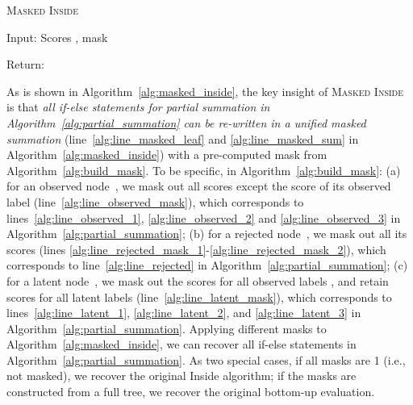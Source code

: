 \begin{algorithm}[t!]
  \small
  \caption{\label{alg:masked_inside} \textsc{Masked Inside}}
  \begin{algorithmic}[1]
  
  \State Input: Scores , mask 
    \State  \label{alg:line_masked_leaf}  
  \EndFor
\State {}
\State {}
  \EndFor

  \State Return: 
  
\end{algorithmic}
\end{algorithm}

 

As is shown in Algorithm~\ref{alg:masked_inside}, the key insight of \textsc{Masked Inside} is that \textit{all if-else statements for partial summation in Algorithm~\ref{alg:partial_summation} 
can be re-written in a unified masked summation} (line~\ref{alg:line_masked_leaf} and \ref{alg:line_masked_sum} in Algorithm~\ref{alg:masked_inside}) with a pre-computed mask  from Algorithm~\ref{alg:build_mask}. 
To be specific, in Algorithm~\ref{alg:build_mask}: 
(a) for an observed node~, we mask out all scores except the score of its observed label (line~\ref{alg:line_observed_mask}), 
which corresponds to lines~\ref{alg:line_observed_1}, \ref{alg:line_observed_2} and \ref{alg:line_observed_3} in Algorithm~\ref{alg:partial_summation}; 
(b) for a rejected node~, we mask out all its scores (lines \ref{alg:line_rejected_mask_1}-\ref{alg:line_rejected_mask_2}), which corresponds to line~\ref{alg:line_rejected} in Algorithm~\ref{alg:partial_summation}; 
(c) for a latent node~\scalebox{0.8}{}, we mask out the scores for all observed labels , and retain scores for all latent labels  (line~\ref{alg:line_latent_mask}), which corresponds to lines~\ref{alg:line_latent_1}, \ref{alg:line_latent_2}, and \ref{alg:line_latent_3} in Algorithm~\ref{alg:partial_summation}. 
Applying different masks to Algorithm~\ref{alg:masked_inside}, we can recover all if-else statements in Algorithm~\ref{alg:partial_summation}. 
As two special cases, if all masks are 1 (i.e., not masked), we recover the original Inside algorithm; if the masks are constructed from a full tree, we recover the original bottom-up evaluation. 

